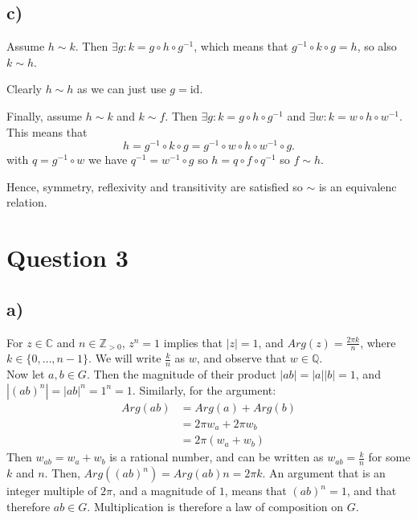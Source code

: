 \documentclass[a4paper,12pt]{article}
\begin{document}
\clearpage
\subsection*{c)}
Assume $h\sim k$. Then $\exists g:k=g\circ h \circ g^{-1}$, which means that $ g^{-1}\circ k\circ g=h $, so also $k\sim h$.

Clearly $h\sim h$ as we can just use $g=\text{id}$.

Finally, assume $h\sim k$ and $k\sim f$. Then
$\exists g:k=g\circ h \circ g^{-1}$ and $\exists w:k=w\circ h \circ w^{-1}$. This means that
\begin{equation*}
    h = g^{-1}\circ k\circ g = g^{-1}\circ w\circ h \circ w^{-1}\circ g.
\end{equation*}
with $q=g^{-1}\circ w$ we have $q^{-1}=w^{-1}\circ g$ so 
$h=q\circ f\circ q^{-1}$ so $f\sim h$.

Hence, symmetry, reflexivity and transitivity are satisfied so $\sim$ is an equivalenc relation.



\clearpage
\section*{Question 3}

\subsection*{a)}

For $z \in \mathbb{C}$ and $n \in \mathbb{Z}_{> 0}$, $z^n = 1$ implies that $|z| = 1$, and $Arg(z) =\frac{2 \pi k}{n}$, where $k \in \{0, \ldots, n - 1\}$. We will write $\frac{k}{n}$ as $w$, and observe that $w \in \mathbb{Q}$.\\

Now let $a,b \in G$. Then the magnitude of their product $|ab| = |a||b| = 1$, and $|(ab)^n|=|ab|^n=1^n=1$. Similarly, for the argument:
\begin{align*}
    Arg(ab) &= Arg(a) + Arg(b)\\
    &= 2 \pi w_a + 2 \pi w_b\\
    &= 2 \pi (w_a + w_b)
\end{align*}
Then $w_{ab} = w_a + w_b$ is a rational number, and can be written as $w_{ab} = \frac{k}{n}$ for some $k$ and $n$. Then, $Arg((ab)^n) = Arg(ab) n = 2\pi k$. An argument that is an integer multiple of $2 \pi$, and a magnitude of $1$, means that $(ab)^n = 1$, and that therefore $ab \in G$. Multiplication is therefore a law of composition on $G$.
\end{document}
